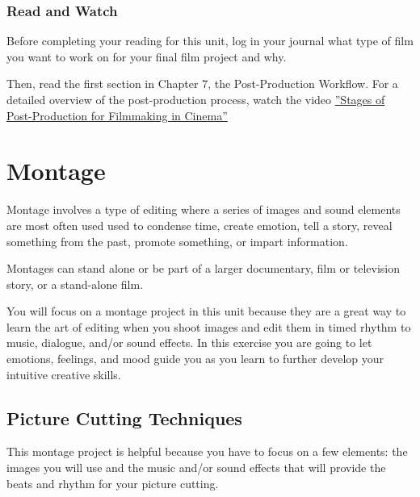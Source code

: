 \documentclass[
]{book}
\begin{document}
\begin{reflect}
\hypertarget{read-and-watch}{%
\subsubsection*{Read and Watch}\label{read-and-watch}}

Before completing your reading for this unit, log in your journal what type of film you want to work on for your final film project and why.

Then, read the first section in Chapter 7, the Post-Production Workflow. For a detailed overview of the post-production process, watch the video \href{https://www.youtube.com/watch?v=IFjyVW21Vpw}{''Stages of Post-Production for Filmmaking in Cinema''}
\end{reflect}

\hypertarget{montage}{%
\section{Montage}\label{montage}}

Montage involves a type of editing where a series of images and sound elements are most often used used to condense time, create emotion, tell a story, reveal something from the past, promote something, or impart information.

Montages can stand alone or be part of a larger documentary, film or television story, or a stand-alone film.

You will focus on a montage project in this unit because they are a great way to learn the art of editing when you shoot images and edit them in timed rhythm to music, dialogue, and/or sound effects. In this exercise you are going to let emotions, feelings, and mood guide you as you learn to further develop your intuitive creative skills.

\hypertarget{picture-cutting-techniques}{%
\subsection*{Picture Cutting Techniques}\label{picture-cutting-techniques}}

This montage project is helpful because you have to focus on a few elements: the images you will use and the music and/or sound effects that will provide the beats and rhythm for your picture cutting.
\end{document}
